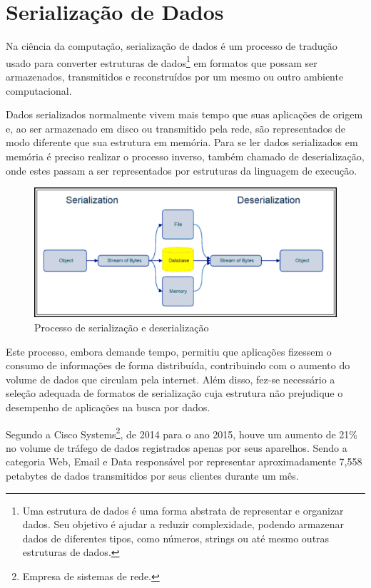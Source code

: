 \section[Serialização de Dados]{Serialização de Dados}

Na ciência da computação, serialização de dados é um processo de tradução usado para converter estruturas de dados\footnote{
  Uma estrutura de dados é uma forma abstrata de representar e organizar dados. Seu objetivo é ajudar a reduzir complexidade, podendo armazenar dados de diferentes tipos, como números, strings ou até mesmo outras estruturas de dados.
} em formatos que possam ser armazenados, transmitidos e reconstruídos por um mesmo ou outro ambiente computacional. \cite{Cline2016}

Dados serializados normalmente vivem mais tempo que suas aplicações de origem e, ao ser armazenado em disco ou transmitido pela rede, são representados de modo diferente que sua estrutura em memória. Para se ler dados serializados em memória é preciso realizar o processo inverso, também chamado de deserialização, onde estes passam a ser representados por estruturas da linguagem de execução. \cite{Guller2016}

\begin{figure}[H]
  \centering
  \includegraphics[width=\textwidth,height=\textheight,keepaspectratio]{figuras/data-serialization-deserialization.png}
  \caption{Processo de serialização e deserialização}
\end{figure}

Este processo, embora demande tempo, permitiu que aplicações fizessem o consumo de informações de forma distribuída, contribuindo com o aumento do volume de dados que circulam pela internet. Além disso, fez-se necessário a seleção adequada de formatos de serialização cuja estrutura não prejudique o desempenho de aplicações na busca por dados. \cite{SumarayMakki2012}

Segundo a Cisco Systems\footnote{
  Empresa de sistemas de rede.
}, de 2014 para o ano 2015, houve um aumento de 21\% no volume de tráfego de dados registrados apenas por seus aparelhos. Sendo a categoria Web, Email e Data responsável por representar aproximadamente 7,558 petabytes de dados transmitidos por seus clientes durante um mês. \cite{Cisco2016}

